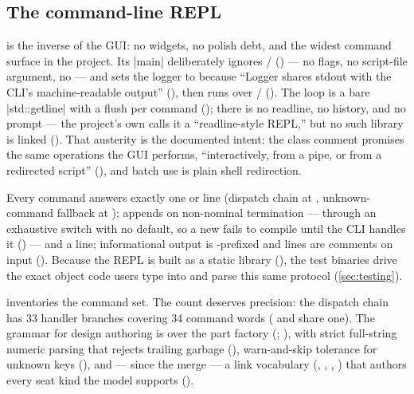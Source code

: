 \subsection{The command-line REPL}\label{sec:interfaces-cli}

 is the inverse of the GUI: no widgets, no polish debt, and the widest command
surface in the project. Its \cppinline|main| deliberately ignores /
() --- no flags, no script-file argument, no  --- and sets
the logger to  because ``Logger shares stdout with the CLI's machine-readable output''
(), then runs  over
/ (). The loop is a bare
\cppinline|std::getline| with a flush per command (); there is no readline,
no history, and no prompt --- the project's own  calls it a ``readline-style REPL,''
but no such library is linked (). That austerity is the documented intent:
the class comment promises the same operations the GUI performs, ``interactively, from a pipe, or
from a redirected script'' (), and batch use is plain shell redirection.

\begin{designrule}
Every command answers exactly one  or  line (dispatch chain at
, unknown-command fallback at );
 appends  on non-nominal termination --- through an exhaustive switch with
no default, so a new  fails to compile until the CLI handles it
() --- and a  line; informational output is
\code{\#}-prefixed and \code{\#} lines are comments on input (). Because the
REPL is built as a static  library (), the test binaries drive
the exact object code users type into and parse this same protocol (\cref{sec:testing}).
\end{designrule}

 inventories the command set. The count deserves precision: the dispatch
chain has 33 handler branches covering 34 command words ( and  share one).
The grammar for design authoring is  over the part factory
(; ), with strict full-string numeric
parsing that rejects trailing garbage (), warn-and-skip tolerance for
unknown keys (), and --- since the  merge --- a link
vocabulary (, , , ) that authors
every  seat kind the model supports ().

